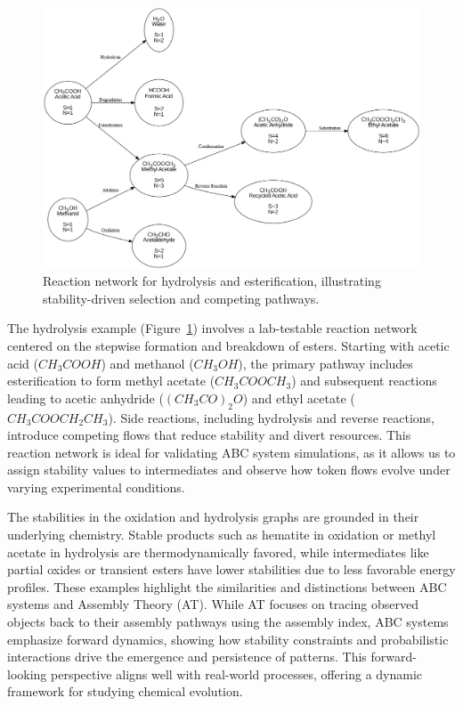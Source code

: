 \documentclass[entropy,article,submit,pdftex,oneauthor]{Definitions/mdpi}
\begin{document}
\begin{figure}[h]
    \centering
    \includegraphics[width=1\textwidth]{abc_hydro.png}
    \caption{Reaction network for hydrolysis and esterification, illustrating stability-driven selection and competing pathways.}
    \label{fig:abc_hydro}
\end{figure}

The hydrolysis example (Figure~\ref{fig:abc_hydro}) involves a lab-testable reaction network centered on the stepwise formation and breakdown of esters. Starting with acetic acid (\(CH_3COOH\)) and methanol (\(CH_3OH\)), the primary pathway includes esterification to form methyl acetate (\(CH_3COOCH_3\)) and subsequent reactions leading to acetic anhydride (\((CH_3CO)_2O\)) and ethyl acetate (\(CH_3COOCH_2CH_3\)). Side reactions, including hydrolysis and reverse reactions, introduce competing flows that reduce stability and divert resources. This reaction network is ideal for validating ABC system simulations, as it allows us to assign stability values to intermediates and observe how token flows evolve under varying experimental conditions.

The stabilities in the oxidation and hydrolysis graphs are grounded in their underlying chemistry. Stable products such as hematite in oxidation or methyl acetate in hydrolysis are thermodynamically favored, while intermediates like partial oxides or transient esters have lower stabilities due to less favorable energy profiles. These examples highlight the similarities and distinctions between ABC systems and Assembly Theory (AT). While AT focuses on tracing observed objects back to their assembly pathways using the assembly index, ABC systems emphasize forward dynamics, showing how stability constraints and probabilistic interactions drive the emergence and persistence of patterns. This forward-looking perspective aligns well with real-world processes, offering a dynamic framework for studying chemical evolution.
\end{document}
